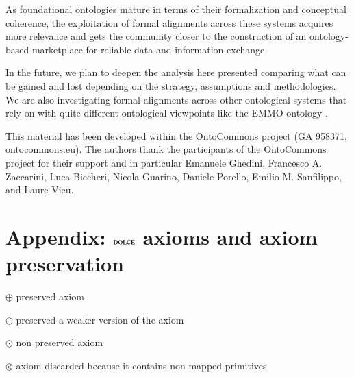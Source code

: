 \documentclass[ao]{iosart2x}
\newcommand{\bflist}{\begin{list}{}{\setlength{\topsep}{2mm}\setlength{\parsep}{0mm}\setlength{\leftmargin}{9.2mm}\setlength{\labelwidth}{8mm}}}
\newcommand{\eflist}{\end{list}}
\newcommand{\dolce}{{\textsc{dolce}}}
\begin{document}
As foundational ontologies mature in terms of their formalization and conceptual coherence, the exploitation of formal alignments across these systems acquires more relevance and gets the community closer to the construction of an ontology-based marketplace for reliable data and information exchange.

In the future, we plan to deepen the analysis here presented comparing what can be gained and lost depending on the strategy, assumptions and methodologies. We are also investigating formal alignments across other ontological systems that rely on with quite different ontological viewpoints like the EMMO ontology \citep{EMMO}.


\begin{acks}
This material has been developed within the OntoCommons project (GA 958371, ontocommons.eu). The authors thank the participants of the OntoCommons project for their support and in particular Emanuele Ghedini, Francesco A. Zaccarini, Luca Biccheri, Nicola Guarino, Daniele Porello, Emilio M. Sanfilippo, and Laure Vieu.
\end{acks}





\nocite{label} 



\newpage 

\section{Appendix: $\dolce$ axioms and axiom preservation}\label{dolce_axioms}

\begin{scriptsize}
\bflist
\item[$\oplus$] preserved axiom
\item[$\ominus$] preserved a weaker version of the axiom
\item[$\odot$] non preserved axiom
\item[$\otimes$] axiom discarded because it contains non-mapped primitives
\eflist
\end{scriptsize}
\end{document}

